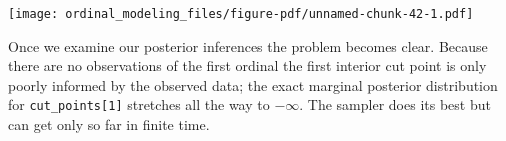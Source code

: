 \documentclass[
  letterpaper,
  DIV=11,
  numbers=noendperiod]{scrartcl}
\newenvironment{Shaded}{\begin{snugshade}}{\end{snugshade}}
\newcommand{\AttributeTok}[1]{\textcolor[rgb]{0.40,0.45,0.13}{#1}}
\newcommand{\ControlFlowTok}[1]{\textcolor[rgb]{0.00,0.23,0.31}{#1}}
\newcommand{\DecValTok}[1]{\textcolor[rgb]{0.68,0.00,0.00}{#1}}
\newcommand{\FloatTok}[1]{\textcolor[rgb]{0.68,0.00,0.00}{#1}}
\newcommand{\FunctionTok}[1]{\textcolor[rgb]{0.28,0.35,0.67}{#1}}
\newcommand{\NormalTok}[1]{\textcolor[rgb]{0.00,0.23,0.31}{#1}}
\newcommand{\OtherTok}[1]{\textcolor[rgb]{0.00,0.23,0.31}{#1}}
\newcommand{\SpecialCharTok}[1]{\textcolor[rgb]{0.37,0.37,0.37}{#1}}
\newcommand{\StringTok}[1]{\textcolor[rgb]{0.13,0.47,0.30}{#1}}
\begin{document}
\begin{Shaded}
\end{Shaded}

\texttt{[image: ordinal\_modeling\_files/figure-pdf/unnamed-chunk-42-1.pdf]}

Once we examine our posterior inferences the problem becomes clear.
Because there are no observations of the first ordinal the first
interior cut point is only poorly informed by the observed data; the
exact marginal posterior distribution for \texttt{cut\_points{[}1{]}}
stretches all the way to \(-\infty\). The sampler does its best but can
get only so far in finite time.

\begin{Shaded}
\end{Shaded}
\end{document}
